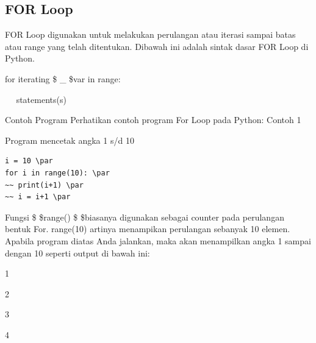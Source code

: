 \subsection{FOR Loop}
FOR Loop digunakan untuk melakukan perulangan atau iterasi sampai batas atau range yang telah ditentukan.\vspace{\baselineskip}
\vspace{\baselineskip}
Dibawah ini adalah sintak dasar FOR Loop di Python.\vspace{\baselineskip}
\vspace{\baselineskip}
 \par
for iterating \$  \_  \$var in range: \par
~~ statements(s) \par
\vspace{\baselineskip}
Contoh Program\vspace{\baselineskip}
\vspace{\baselineskip}
Perhatikan contoh program For Loop pada Python:\vspace{\baselineskip}
\vspace{\baselineskip}
Contoh 1\vspace{\baselineskip}
\vspace{\baselineskip}
 \par
Program mencetak angka 1 s/d 10 \par
\vspace{12pt}
\begin{verbatim}
i = 10 \par
for i in range(10): \par
~~ print(i+1) \par
~~ i = i+1 \par
\end{verbatim}
\vspace{\baselineskip}
Fungsi \$  \$range() \$  \$biasanya digunakan sebagai counter pada perulangan bentuk For. range(10) artinya menampikan perulangan sebanyak 10 elemen.\vspace{\baselineskip}
\vspace{\baselineskip}
Apabila program diatas Anda jalankan, maka akan menampilkan angka 1 sampai dengan 10 seperti output di bawah ini:\vspace{\baselineskip}
\vspace{\baselineskip}
 \par
1 \par
2 \par
3 \par
4 \par
